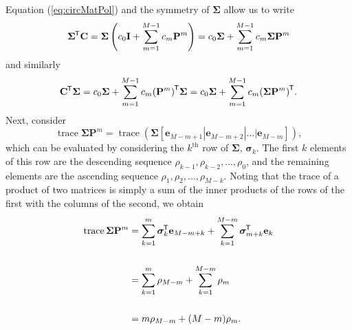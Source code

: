 \documentclass[letterpaper,12pt,oneside,final]{article}
\newcommand{\ve}[1]{\mathbf{#1}}           %
\newcommand{\sv}[1]{\boldsymbol{#1}}   %
\newcommand{\m}[1]{\mathbf{#1}}               %
\newcommand{\sm}[1]{\boldsymbol{#1}}   %
\newcommand{\tr}[1]{{#1}^{\mkern-1.5mu\mathsf{T}}}              %
\newcommand*{\trace}{\operatorname{trace}}
\begin{document}
Equation (\ref{eq:circMatPol}) and the symmetry of $\sm{\Sigma}$ allow us to write
$$\tr{\sm{\Sigma}} \m{C} = \sm{\Sigma} \left ( c_0 \m{I} + \sum_{m = 1}^{M-1} c_m \m{P}^m \right ) = c_0 \sm{\Sigma} + \sum_{m = 1}^{M-1} c_m \sm{\Sigma} \m{P}^m$$
and similarly
$$\tr{\m{C}} \sm{\Sigma} = c_0 \sm{\Sigma} + \sum_{m = 1}^{M-1} c_m \tr{\left ( \m{P}^m \right )} \sm{\Sigma} =  c_0 \sm{\Sigma} + \sum_{m = 1}^{M-1} c_m \tr{\left (\sm{\Sigma} \m{P}^m \right )}.$$
Next, consider
\begin{equation*}
    \trace \sm{\Sigma} \m{P}^m  = \trace \left ( \sm{\Sigma} [\ve{e}_{M-m+1} | \ve{e}_{M-m+2} | \dots | \ve{e}_{M-m} ] \right ),
\end{equation*}
which can be evaluated by considering the $k^{\text{th}}$ row of $\sm{\Sigma}$, $\sv{\sigma}_k$. The first $k$ elements of this row are the descending sequence $\rho_{k-1}, \rho_{k-2}, \dots, \rho_0$, and the remaining elements are the ascending sequence $\rho_1, \rho_2, \dots, \rho_{M-k}$. Noting that the trace of a product of two matrices is simply a sum of the inner products of the rows of the first with the columns of the second, we obtain
\begin{equation} \label{eq:productTrace}
  \begin{split}
    \trace \sm{\Sigma} \m{P}^m & = \sum_{k = 1}^{m} \tr{\sv{\sigma}}_k \ve{e}_{M-m+k} + \sum_{k = 1}^{M - m} \tr{\sv{\sigma}}_{m+k} \ve{e}_{k} \\
    & \\
    & = \sum_{k=1}^m \rho_{M-m} + \sum_{k=1}^{M-m} \rho_m \\
    & \\
    & = m \rho_{M-m} + (M-m) \rho_m.
  \end{split}
\end{equation}
\end{document}

